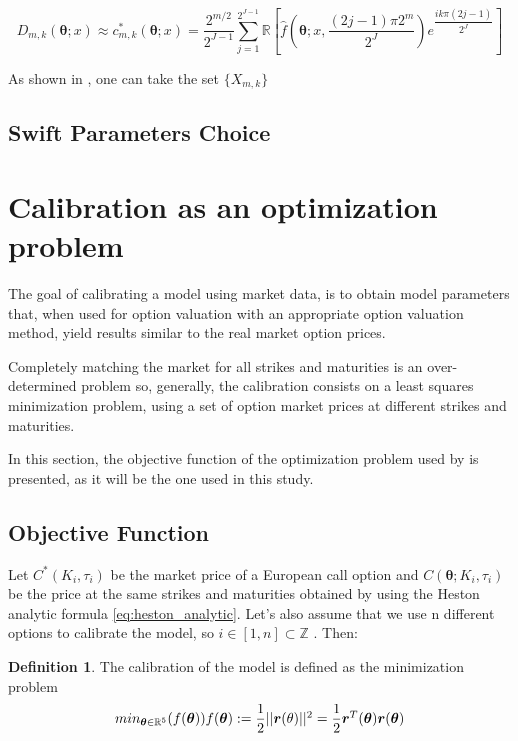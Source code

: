 \documentclass[12,twoside]{mammeTFM}
\theoremstyle{definition}
\newtheorem{definition}[thm]{Definition}
\theoremstyle{remark}
\newcommand{\Z}{\ensuremath{\mathbb{Z}}}
\newcommand{\R}{\ensuremath{\mathbb{R}}}
\begin{document}
\begin{equation}
D_{m,k}(\boldsymbol{\theta}; x) \approx c^*_{m,k} (\boldsymbol{\theta}; x) = \dfrac{2^{m/2}}{2^{J-1}} \sum_{j=1}^{2^{J-1}} \R \left[\hat{f}\left(\boldsymbol{\theta}; x, \dfrac{(2j - 1) \pi 2^m}{2^J}\right) e^{\dfrac{ik\pi(2j-1)}{2^J}}\right] 
\end{equation}

As shown in \cite{Ortiz-Gracia2016}, one can take the set $\{X_{m,k}\}$

\subsection{Swift Parameters Choice}

\section{Calibration as an optimization problem} \label{chap:optimization_problem}
The goal of calibrating a model using market data, is to obtain model parameters that, when used for option valuation with an appropriate option valuation method, yield results similar to the real market option prices.

Completely matching the market for all strikes and maturities is an over-determined problem so, generally, the calibration consists on a least squares minimization problem, using a set of option market prices at different strikes and maturities.

In this section, the objective function of the optimization problem used by \cite{cui17} is presented, as it will be the one used in this study.

\subsection{Objective Function}
Let $C^*(K_i, \tau_i)$ be the market price of a European call option and
 $C(\boldsymbol{\theta}; K_i, \tau_i)$ be the price at the same strikes and maturities obtained by using the Heston analytic formula \ref{eq:heston_analytic}. Let's also assume that we use n different options to calibrate the model, so 
 $i \in [1,n] \subset \Z$
 . Then:
\begin{definition} The calibration of the model is defined as the minimization problem 
\begin{equation} \label{eq:opt_problem}
min_{\boldsymbol{\theta} \in \R^5} (f(\boldsymbol{\theta}))$$ $$f(\boldsymbol{\theta}) := \dfrac{1}{2}||\boldsymbol{r}(\theta)||^2 = \dfrac{1}{2} \boldsymbol{r}^T(\boldsymbol{\theta})\boldsymbol{r}(\boldsymbol{\theta})
\end{equation}
\end{definition}
\end{document}
